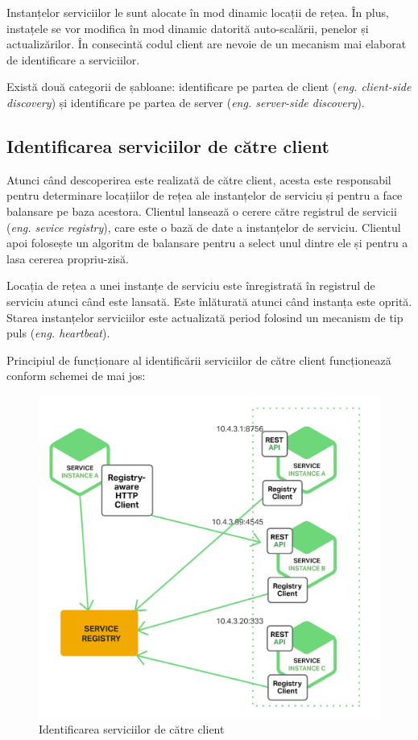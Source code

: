 \documentclass[12pt, a4paper, oneside, romanian]{teza-upb}
\begin{document}
Instanțelor serviciilor le sunt alocate în mod dinamic locații de rețea.  În plus, instațele se vor modifica în mod dinamic datorită auto-scalării, penelor și actualizărilor. În  consecintă codul client are nevoie de un mecanism mai elaborat de identificare a serviciilor. 

Există două categorii de șabloane: identificare pe partea de client (\textit{eng. client-side discovery}) și identificare pe partea de server (\textit{eng. server-side discovery}).

\subsection{Identificarea serviciilor de către client}

Atunci când descoperirea este realizată de către client, acesta este responsabil pentru determinare locațiilor de rețea ale instanțelor de serviciu și pentru a face balansare pe baza acestora. Clientul lansează o cerere către registrul de servicii (\textit{eng. sevice registry}), care este o bază de date a instanțelor de serviciu. Clientul apoi folosește un algoritm de balansare pentru a select unul dintre ele și pentru a lasa cererea propriu-zisă. 

Locația de rețea a unei instanțe de serviciu este înregistrată în registrul de serviciu atunci când este lansată. Este înlăturată atunci când instanța este oprită. Starea instanțelor serviciilor este actualizată period folosind un mecanism de tip puls (\textit{eng. heartbeat}).

\newpage

Principiul de funcționare al identificării serviciilor de către client funcționează conform schemei de mai jos:

\begin{figure}[ht]
\centering
\includegraphics[scale=0.25]{img/Richardson-microservices-part4-2_client-side-pattern.png}
\caption{Identificarea serviciilor de către client}
\label{fig:arhi_componente}
\end{figure}
\end{document}
